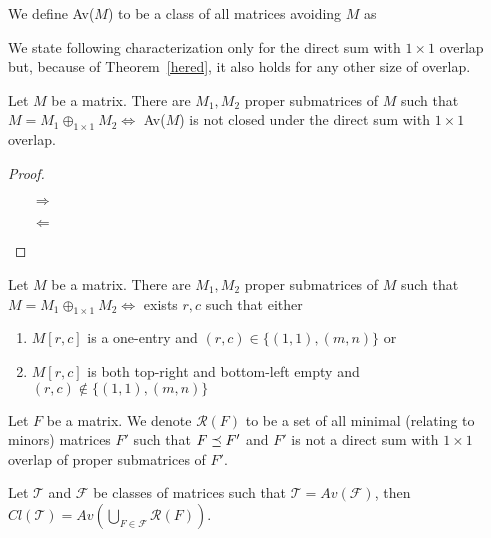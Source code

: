 \begin{ntn}
We define Av($M$) to be a class of all matrices avoiding $M$ as 
\end{ntn}
We state following characterization only for the direct sum with $1\times1$ overlap but, because of Theorem~\ref{hered}, it also holds for any other size of overlap.
\begin{thm}
Let $M$ be a matrix. There are $M_1,M_2$ proper submatrices of $M$ such that $M=M_1\oplus_{1\times1}M_2\Leftrightarrow$ Av($M$) is not closed under the direct sum with $1\times1$ overlap.
\end{thm}
\begin{proof}
\begin{itemize}
\item[$\Rightarrow$]
\item[$\Leftarrow$]
\end{itemize}
\end{proof}
\begin{obs}
\label{obsart}
Let $M$ be a matrix. There are $M_1,M_2$ proper submatrices of $M$ such that $M=M_1\oplus_{1\times1}M_2\Leftrightarrow$ exists $r,c$ such that either
\begin{enumerate}
\item $M[r,c]$ is a one-entry and $(r,c)\in\{(1,1),(m,n)\}$ or
\item $M[r,c]$ is both top-right and bottom-left empty and $(r,c)\not\in\{(1,1),(m,n)\}$
\end{enumerate}
\end{obs}
\begin{defn}
Let $F$ be a matrix. We denote $\mathcal{R}(F)$ to be a set of all minimal (relating to minors) matrices $F'$ such that $F\preceq F'$ and $F'$ is not a direct sum with $1\times1$ overlap of proper submatrices of $F'$.
\end{defn}
\begin{lemma}
Let $\mathcal{T}$ and $\mathcal{F}$ be classes of matrices such that $\mathcal{T}=Av(\mathcal{F})$, then $Cl(\mathcal{T})=Av(\bigcup_{F\in\mathcal{F}}\mathcal{R}(F))$.
\end{lemma}
